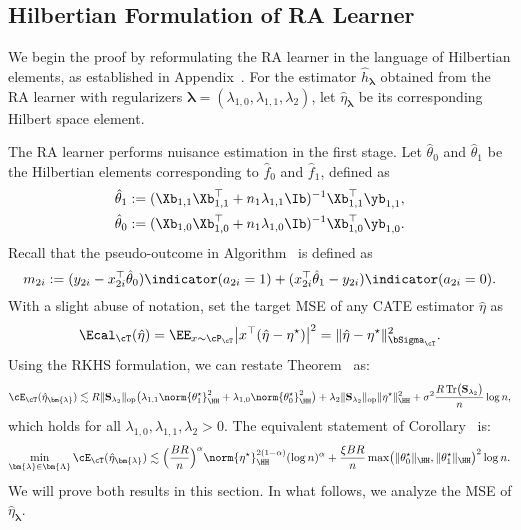 \documentclass[12pt,a4paper,pdftex,onepage]{article}
\newcommand{\op}{\operatorname{op}}
\newcommand{\sig}{\sigma}
\newcommand{\Sbar}{\mathbf{S}}
\begin{document}
\subsection{Hilbertian Formulation of RA Learner}\label{subsection; Hilbertian formulation RA learner}
\noindent
We begin the proof by reformulating the RA learner in the language of Hilbertian elements, as established in Appendix~. 
For the estimator \(\hat{h}_{\bm{\lambda}}\) obtained from the RA learner with regularizers \(\bm{\lambda} = (\lambda_{1,0}, \lambda_{1,1}, \lambda_2)\), let \(\hat{\eta}_{\bm{\lambda}}\) be its corresponding Hilbert space element.

The RA learner performs nuisance estimation in the first stage.
Let \(\hat{\theta}_0\) and \(\hat{\theta}_1\) be the Hilbertian elements corresponding to \(\hat{f}_0\) and \(\hat{f}_1\), defined as 
\begin{align*}
&\hat{\theta}_1 := (\Xb_{1,1}\Xb_{1,1}^\top + n_{1} \lambda_{1,1}\Ib)^{-1} \Xb_{1,1}^\top \yb_{1,1},\\
&\hat{\theta}_0 := (\Xb_{1,0}\Xb_{1,0}^\top + n_{1} \lambda_{1,0}\Ib)^{-1} \Xb_{1,0}^\top \yb_{1,0}.
\end{align*}
Recall that the pseudo-outcome in Algorithm~ is defined as 
\[
m_{2i} := (y_{2i} - x_{2i}^\top \hat{\theta}_0)\indicator(a_{2i}=1) + (x_{2i}^\top \hat{\theta}_1 - y_{2i}) \indicator(a_{2i}=0).
\]
With a slight abuse of notation, set the target MSE of any CATE estimator \(\hat{\eta}\) as 
\[
\Ecal_{\cT}(\hat{\eta}) = \EE_{x \sim \cP_\cT} \bigl|x^\top(\hat{\eta}-\eta^\star)\bigr|^2 
= \|\hat{\eta} - \eta^\star \|_{\bSigma_\cT}^2.
\]
Using the RKHS formulation, we can restate Theorem~ as:
\[
\cE_\cT(\hat{\eta}_{\bm{\lambda}}) 
\lesssim R \|\Sbar_{\lambda_2} \|_{\op}
\bigl(\lambda_{1,1}\norm{\theta^\star_1}_{\HH}^2 + \lambda_{1,0}\norm{\theta^\star_0}_{\HH}^2\bigr)
+ \lambda_2 \|\Sbar_{\lambda_2} \|_{\op} \|\eta^{\star}\|_{\HH}^2
+\sig^2  \frac{ R\operatorname{Tr}\bigl(\Sbar_{\lambda_2}\bigr)}{n}\log n,
\]
which holds for all \(\lambda_{1,0}, \lambda_{1,1}, \lambda_{2} >0\).
The equivalent statement of Corollary~ is:
\[
\min_{\bm{\lambda} \in \bm{\Lambda}} \cE_\cT(\hat{\eta}_{\bm{\lambda}}) 
\lesssim 
\Bigl(\frac{BR}{n}\Bigr)^{\alpha}
\norm{\eta^\star}_{\HH}^{2(1-\alpha)}
(\log n)^\alpha
+ \frac{\xi BR}{n}\max\bigl(\|\theta_{0}^\star\|_{\HH}, \|\theta_{1}^\star\|_{\HH}\bigr)^2 \log n.
\]
We will prove both results in this section.
In what follows, we analyze the MSE of \(\hat{\eta}_{\bm{\lambda}}\).
\end{document}
